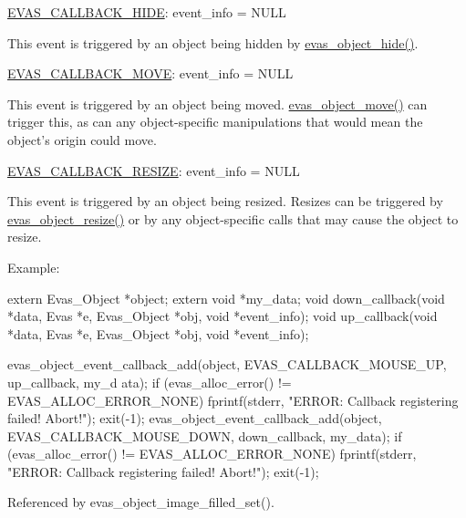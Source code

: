 \hyperlink{Evas_8h_a99e208e463a20499aabe6faac8a8cb8aa635d910ff45c89f4d7b91630add35cd7}{EVAS\_\-CALLBACK\_\-HIDE}: event\_\-info = NULL

This event is triggered by an object being hidden by \hyperlink{group__Evas__Object__Group__Basic_ga495807707f06f9acd4de8590a8c92148}{evas\_\-object\_\-hide()}.

\hyperlink{Evas_8h_a99e208e463a20499aabe6faac8a8cb8aa9b66bd091da76fb13f551c6db04502b0}{EVAS\_\-CALLBACK\_\-MOVE}: event\_\-info = NULL

This event is triggered by an object being moved. \hyperlink{group__Evas__Object__Group__Basic_ga78fa8858c51707f1a557b720014b71cc}{evas\_\-object\_\-move()} can trigger this, as can any object-\/specific manipulations that would mean the object's origin could move.

\hyperlink{Evas_8h_a99e208e463a20499aabe6faac8a8cb8aa554e3341a4ae95e15d42da495f8adb21}{EVAS\_\-CALLBACK\_\-RESIZE}: event\_\-info = NULL

This event is triggered by an object being resized. Resizes can be triggered by \hyperlink{group__Evas__Object__Group__Basic_ga34df8b33704deafd2a25f40e3c09d149}{evas\_\-object\_\-resize()} or by any object-\/specific calls that may cause the object to resize.

Example: 
\begin{DoxyCode}
 extern Evas_Object *object;
 extern void *my_data;
 void down_callback(void *data, Evas *e, Evas_Object *obj, void *event_info);
 void up_callback(void *data, Evas *e, Evas_Object *obj, void *event_info);

 evas_object_event_callback_add(object, EVAS_CALLBACK_MOUSE_UP, up_callback, my_d
      ata);
 if (evas_alloc_error() != EVAS_ALLOC_ERROR_NONE)
   {
     fprintf(stderr, "ERROR: Callback registering failed! Abort!\n");
     exit(-1);
   }
 evas_object_event_callback_add(object, EVAS_CALLBACK_MOUSE_DOWN, down_callback, 
      my_data);
 if (evas_alloc_error() != EVAS_ALLOC_ERROR_NONE)
   {
     fprintf(stderr, "ERROR: Callback registering failed! Abort!\n");
     exit(-1);
   }
\end{DoxyCode}
 

Referenced by evas\_\-object\_\-image\_\-filled\_\-set().

